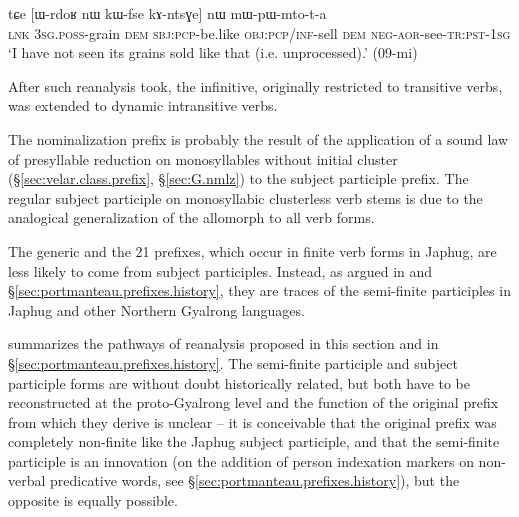 \begin{exe}
\ex \label{ex:kAntsGe.nW.mWpWmtota} 
\gll tɕe [ɯ-rdoʁ nɯ kɯ-fse kɤ-ntsɣe] nɯ mɯ-pɯ-mto-t-a \\
\textsc{lnk} \textsc{3sg}.\textsc{poss}-grain \textsc{dem} \textsc{sbj}:\textsc{pcp}-be.like \textsc{obj}:\textsc{pcp}/\textsc{inf}-sell \textsc{dem} \textsc{neg}-\textsc{aor}-see-\textsc{tr}:\textsc{pst}-\textsc{1sg} \\
\glt `I have not seen its grains sold like that (i.e. unprocessed).' (09-mi) 
\end{exe}

After such reanalysis took, the  infinitive, originally restricted to transitive verbs, was extended to dynamic intransitive verbs. 

The nominalization  prefix is probably the result of the application of a sound law of presyllable reduction on monosyllables without initial cluster (§\ref{sec:velar.class.prefix}, §\ref{sec:G.nmlz}) to the subject participle prefix. The regular  subject participle on monosyllabic clusterless verb stems is due to the analogical generalization of the  allomorph to all verb forms.

The generic  and the 2\fl{}1  prefixes, which occur in finite verb forms in Japhug, are less likely to come from subject participles. Instead, as argued in \citet{jacques18generic} and §\ref{sec:portmanteau.prefixes.history}, they are traces of the semi-finite participles in Japhug and other Northern Gyalrong languages.

 summarizes the pathways of reanalysis proposed in this section and in §\ref{sec:portmanteau.prefixes.history}. The semi-finite participle and subject participle forms are without doubt historically related, but both have to be reconstructed at the proto-Gyalrong level and the function of the original prefix from which they derive is unclear -- it is conceivable that the original prefix was completely non-finite like the Japhug subject participle, and that the semi-finite participle is an innovation (on the addition of person indexation markers on non-verbal predicative words, see §\ref{sec:portmanteau.prefixes.history}), but the opposite is equally possible.

